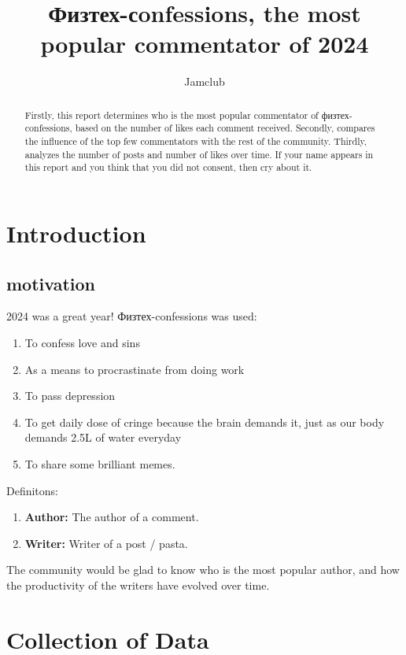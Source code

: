 \documentclass[
	12pt
] {article}
\author[1]{Jamclub}
\affil[1]{Физтех-confessions}
\title{Физтех-сonfessions, the most popular commentator of 2024}
\begin{document}
\maketitle
\renewcommand{\arraystretch}{1.3}

\begin{abstract}
	Firstly, this report determines who is the most popular commentator of физтех-confessions, based on the number of likes each comment received.
	Secondly, compares the influence of the top few commentators with the rest of the community.
	Thirdly, analyzes the number of posts and number of likes over time.
	If your name appears in this report and you think that you did not consent, then cry about it.
	\end{abstract}

\tableofcontents


\section{Introduction}
\subsection{motivation}
	2024 was a great year! Физтех-confessions was used:
	\begin{enumerate}
		\item To confess love and sins
		\item As a means to procrastinate from doing work
		\item To pass depression
		\item To get daily dose of cringe because the brain demands it, just as our body demands \num{2.5}L of water everyday
		\item To share some brilliant memes.
	\end{enumerate}
	
	Definitons:
	\begin{enumerate}
		\item \textbf{Author:} The author of a comment.
		\item \textbf{Writer:} Writer of a post / pasta.
	\end{enumerate}
	
	The community would be glad to know who is the most popular author, and how the productivity of the writers have evolved over time.

\section{Collection of Data}
\end{document}
